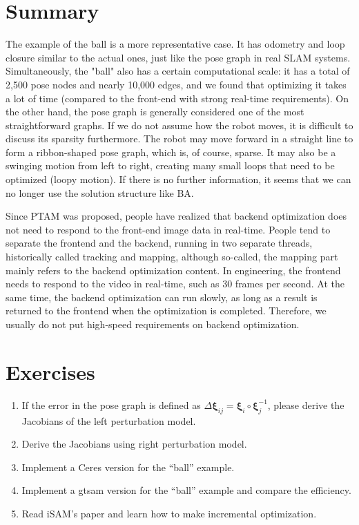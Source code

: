\section{Summary}
The example of the ball is a more representative case. It has odometry and loop closure similar to the actual ones, just like the pose graph in real SLAM systems. Simultaneously, the "ball" also has a certain computational scale: it has a total of 2,500 pose nodes and nearly 10,000 edges, and we found that optimizing it takes a lot of time (compared to the front-end with strong real-time requirements). On the other hand, the pose graph is generally considered one of the most straightforward graphs. If we do not assume how the robot moves, it is difficult to discuss its sparsity furthermore. The robot may move forward in a straight line to form a ribbon-shaped pose graph, which is, of course, sparse. It may also be a swinging motion from left to right, creating many small loops that need to be optimized (loopy motion). If there is no further information, it seems that we can no longer use the solution structure like BA.

Since PTAM\textsuperscript{\cite{Klein2007}} was proposed, people have realized that backend optimization does not need to respond to the front-end image data in real-time. People tend to separate the frontend and the backend, running in two separate threads, historically called tracking and mapping, although so-called, the mapping part mainly refers to the backend optimization content. In engineering, the frontend needs to respond to the video in real-time, such as 30 frames per second. At the same time, the backend optimization can run slowly, as long as a result is returned to the frontend when the optimization is completed. Therefore, we usually do not put high-speed requirements on backend optimization.

\section*{Exercises}
\begin{enumerate}
	\item If the error in the pose graph is defined as $\Delta \bm{\xi}_{ij} = \bm{\xi}_i \circ \bm{\xi}_j^{-1}$, please derive the Jacobians of the left perturbation model.
	\item Derive the Jacobians using right perturbation model. 
	\item Implement a Ceres version for the ``ball'' example. 
	\item Implement a gtsam version for the ``ball'' example and compare the efficiency. 
	\item[\optional] Read iSAM's paper \cite{Kaess2008,Kaess2011} and learn how to make incremental optimization. 
\end{enumerate}

